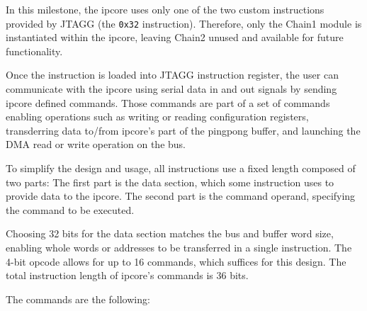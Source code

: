 \documentclass[a4paper,11pt,oneside]{report}
\begin{document}
In this milestone, the ipcore uses only one of the two custom instructions provided by JTAGG (the \texttt{0x32} instruction).  
Therefore, only the Chain1 module is instantiated within the ipcore, leaving Chain2 unused and available for future functionality.

Once the instruction is loaded into JTAGG instruction register, the user can communicate with the ipcore using serial data in and out signals by sending 
 ipcore defined commands.
Those commands are part of a set of commands enabling operations such as writing or reading configuration registers, transderring data to/from ipcore's part of the pingpong buffer,
and launching the DMA read or write operation on the bus.

To simplify the design and usage, all instructions use a fixed length composed of two parts:
The first part is the data section, which some instruction uses to provide data to the ipcore.
The second part is the command operand, specifying the command to be executed.

Choosing 32 bits for the data section matches the bus and buffer word size, enabling whole words or addresses to be transferred in a single instruction.  
The 4-bit opcode allows for up to 16 commands, which suffices for this design.
The total instruction length of ipcore's commands is 36 bits.

The commands are the following:
\end{document}
